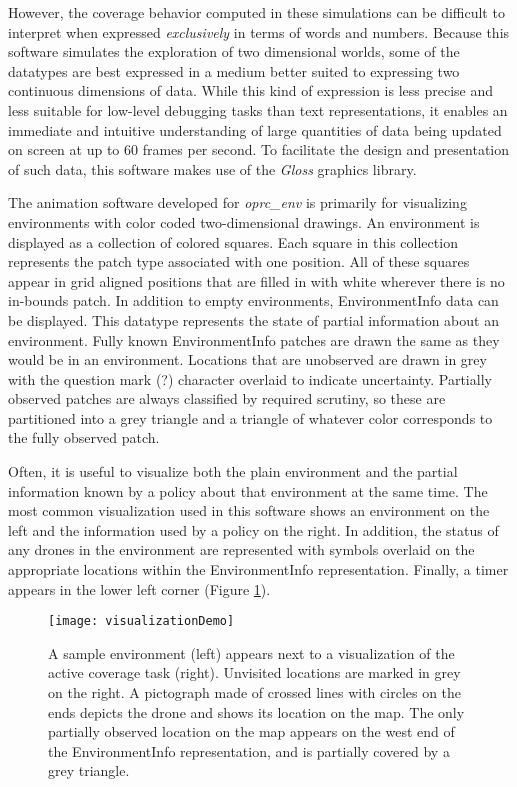 However, the coverage behavior computed in these simulations can be difficult to interpret when expressed \textit{exclusively} in terms of words and numbers. Because this software simulates the exploration of two dimensional worlds, some of the datatypes are best expressed in a medium better suited to expressing two continuous dimensions of data. While this kind of expression is less precise and less suitable for low-level debugging tasks than text representations, it enables an immediate and intuitive understanding of large quantities of data being updated on screen at up to 60 frames per second. To facilitate the design and presentation of such data, this software makes use of the \textit{Gloss} graphics library.

The animation software developed for \textit{oprc\_env} is primarily for visualizing environments with color coded two-dimensional drawings. An environment is displayed as a collection of colored squares. Each square in this collection represents the patch type associated with one position. All of these squares appear in grid aligned positions that are filled in with white wherever there is no in-bounds patch. In addition to empty environments, EnvironmentInfo data can be displayed. This datatype represents the state of partial information about an environment. Fully known EnvironmentInfo patches are drawn the same as they would be in an environment. Locations that are unobserved are drawn in grey with the question mark (?) character overlaid to indicate uncertainty. Partially observed patches are always classified by required scrutiny, so these are partitioned into a grey triangle and a triangle of whatever color corresponds to the fully observed patch.

Often, it is useful to visualize both the plain environment and the partial information known by a policy about that environment at the same time. The most common visualization used in this software shows an environment on the left and the information used by a policy on the right. In addition, the status of any drones in the environment are represented with symbols overlaid on the appropriate locations within the EnvironmentInfo representation. Finally, a timer appears in the lower left corner (Figure \ref{fig:VizDemo}).

\begin{figure}[H]
\texttt{[image: visualizationDemo]}
\caption[Visualization of a Small Environment During Coverage]{A sample environment (left) appears next to a visualization of the active coverage task (right). Unvisited locations are marked in grey on the right. A pictograph made of crossed lines with circles on the ends depicts the drone and shows its location on the map. The only partially observed location on the map appears on the west end of the EnvironmentInfo representation, and is partially covered by a grey triangle.}
\label {fig:VizDemo}
\end{figure}

